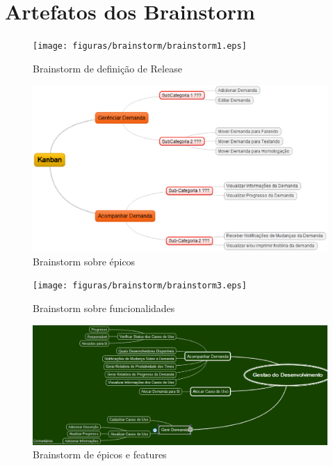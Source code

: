 \chapter[Artefatos dos Brainstorm]{Artefatos dos Brainstorm} \label{apendices:brainstorms}

\begin{figure}[H]
	\centering
	\texttt{[image: figuras/brainstorm/brainstorm1.eps]}
	\caption{Brainstorm de definição de Release}
	\label{}
\end{figure}

\begin{figure}[H]
	\centering
	\includegraphics[keepaspectratio=true,scale=0.8]{figuras/brainstorm/brainstorm2.eps}
	\caption{Brainstorm sobre épicos}
	\label{}
\end{figure}

\begin{figure}[H]
	\centering
	\texttt{[image: figuras/brainstorm/brainstorm3.eps]}
	\caption{Brainstorm sobre funcionalidades}
	\label{}
\end{figure}

\begin{figure}[H]
	\centering
	\includegraphics[keepaspectratio=true,scale=0.6]{figuras/brainstorm/brainstorm4.eps}
	\caption{Brainstorm de épicos e features}
	\label{}
\end{figure}

